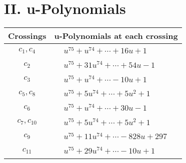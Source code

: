 \documentclass[1p]{elsarticle_modified}
\theoremstyle{definition}
\begin{document}
\newpage\renewcommand{\arraystretch}{1}
\centering \section*{ II. u-Polynomials}
\begin{tabular}{m{50pt}|m{274pt}}
Crossings & \hspace{64pt}u-Polynomials at each crossing \\
\hline $$\begin{aligned}c_{1},c_{4}\end{aligned}$$&$\begin{aligned}
&u^{75}+u^{74}+\cdots+16 u+1
\end{aligned}$\\
\hline $$\begin{aligned}c_{2}\end{aligned}$$&$\begin{aligned}
&u^{75}+31 u^{74}+\cdots+54 u-1
\end{aligned}$\\
\hline $$\begin{aligned}c_{3}\end{aligned}$$&$\begin{aligned}
&u^{75}+u^{74}+\cdots-10 u+1
\end{aligned}$\\
\hline $$\begin{aligned}c_{5},c_{8}\end{aligned}$$&$\begin{aligned}
&u^{75}+5 u^{74}+\cdots+5 u^2+1
\end{aligned}$\\
\hline $$\begin{aligned}c_{6}\end{aligned}$$&$\begin{aligned}
&u^{75}+u^{74}+\cdots+30 u-1
\end{aligned}$\\
\hline $$\begin{aligned}c_{7},c_{10}\end{aligned}$$&$\begin{aligned}
&u^{75}+5 u^{74}+\cdots+5 u^2+1
\end{aligned}$\\
\hline $$\begin{aligned}c_{9}\end{aligned}$$&$\begin{aligned}
&u^{75}+11 u^{74}+\cdots-828 u+297
\end{aligned}$\\
\hline $$\begin{aligned}c_{11}\end{aligned}$$&$\begin{aligned}
&u^{75}+29 u^{74}+\cdots-10 u+1
\end{aligned}$\\
\hline
\end{tabular}\newpage\renewcommand{\arraystretch}{1}
\end{document}

